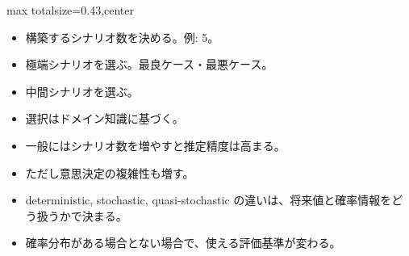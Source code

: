 \clearpage
{}
\begin{minipage}[t]{0.405\textwidth}
\begin{adjustbox}{max totalsize={\textwidth}{0.43\textheight},center}
\begin{minipage}{\textwidth}\scriptsize
{}\begin{itemize}
\item 構築するシナリオ数を決める。例: 5。
\item 極端シナリオを選ぶ。最良ケース・最悪ケース。
\item 中間シナリオを選ぶ。
\item 選択はドメイン知識に基づく。
\item 一般にはシナリオ数を増やすと推定精度は高まる。
\item ただし意思決定の複雑性も増す。
\end{itemize}\begin{itemize}
\item deterministic, stochastic, quasi-stochastic の違いは、将来値と確率情報をどう扱うかで決まる。
\item 確率分布がある場合とない場合で、使える評価基準が変わる。
\end{itemize}
\end{minipage}
\end{adjustbox}
\end{minipage}\hfill
